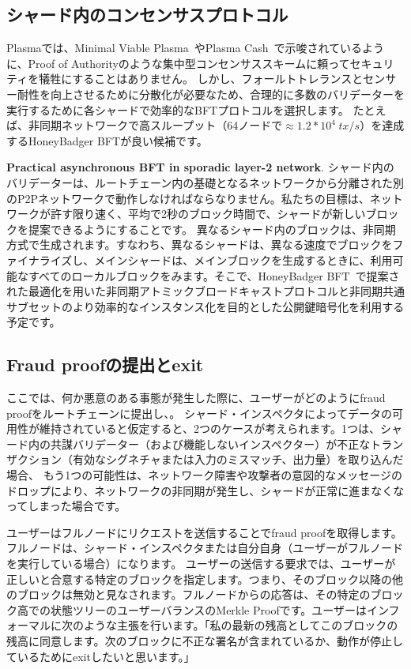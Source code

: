 \subsection{シャード内のコンセンサスプロトコル}\label{shard-consensus}
Plasmaでは、Minimal Viable Plasma~\cite{plasma-mvp}やPlasma Cash~\cite{plasma-cash}で示唆されているように、Proof of Authorityのような集中型コンセンサススキームに頼ってセキュリティを犠牲にすることはありません。 しかし、フォールトトレランスとセンサー耐性を向上させるために分散化が必要なため、合理的に多数のバリデーターを実行するために各シャードで効率的なBFTプロトコルを選択します。 たとえば、非同期ネットワークで高スループット（64ノードで$\approx 1.2*10^4\hspace{3pt} tx/s$）を達成するHoneyBadger BFT\cite{honeybadger}が良い候補です。

\textbf{Practical asynchronous BFT in sporadic layer-2 network}.
シャード内のバリデーターは、ルートチェーン内の基礎となるネットワークから分離された別のP2Pネットワークで動作しなければならなりません。私たちの目標は、ネットワークが許す限り速く、平均で2秒のブロック時間で、シャードが新しいブロックを提案できるようにすることです。 異なるシャード内のブロックは、非同期方式で生成されます。すなわち、異なるシャードは、異なる速度でブロックをファイナライズし、メインシャードは、メインブロックを生成するときに、利用可能なすべてのローカルブロックをみます。そこで、HoneyBadger BFT~\cite{honeybadger}で提案された最適化を用いた非同期アトミックブロードキャストプロトコルと非同期共通サブセットのより効率的なインスタンス化を目的とした公開鍵暗号化を利用する予定です。

\subsection{Fraud proofの提出とexit}
ここでは、何か悪意のある事態が発生した際に、ユーザーがどのようにfraud proofをルートチェーンに提出し、。 シャード・インスペクタによってデータの可用性が維持されていると仮定すると、2つのケースが考えられます。1つは、シャード内の共謀バリデーター（および機能しないインスペクター）が不正なトランザクション（有効なシグネチャまたは入力のミスマッチ、出力量）を取り込んだ場合、 もう1つの可能性は、ネットワーク障害や攻撃者の意図的なメッセージのドロップにより、ネットワークの非同期が発生し、シャードが正常に進まなくなってしまった場合です。

ユーザーはフルノードにリクエストを送信することでfraud proofを取得します。フルノードは、シャード・インスペクタまたは自分自身（ユーザーがフルノードを実行している場合）になります。 ユーザーの送信する要求では、ユーザーが正しいと合意する特定のブロックを指定します。つまり、そのブロック以降の他のブロックは無効と見なされます。フルノードからの応答は、その特定のブロック高での状態ツリーのユーザーバランスのMerkle Proofです。ユーザーはインフォーマルに次のような主張を行います。「私の最新の残高としてこのブロックの残高に同意します。次のブロックに不正な署名が含まれているか、動作が停止しているためにexitしたいと思います。」

